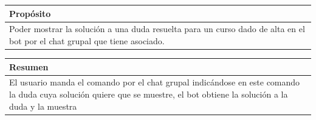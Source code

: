 \begin{table}[!ht]

\begin{tabular}{|m{10cm}|}
\hline\rowcolor{Gray}
{\bf Propósito}\\
\hline
{	    Poder mostrar la solución a una duda resuelta para un curso dado de alta en el bot por el chat grupal que tiene asociado.
 } \\
\hline

\end{tabular}


\end{table}

\begin{table}[!ht]

\begin{tabular}{|m{10cm}|}
\hline\rowcolor{Gray}
{\bf Resumen}\\
\hline
{El usuario manda el comando por el chat grupal indicándose en este comando la duda cuya solución quiere que se muestre, el bot obtiene la solución a la duda y la muestra} \\
\hline

\end{tabular}



\end{table}

